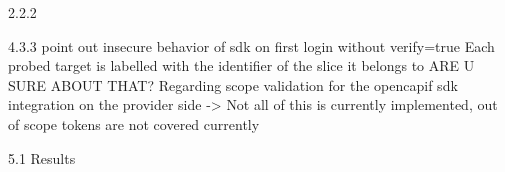 2.2.2

4.3.3
{\color{blue}point out insecure behavior of sdk on first login without verify=true}
Each probed target is labelled with the identifier of the slice it belongs to {\color{blue} ARE U SURE ABOUT THAT?}
Regarding scope validation for the opencapif sdk integration on the provider side -> {\color{blue} Not all of this is currently implemented, out of scope tokens are not covered currently}

5.1 Results
